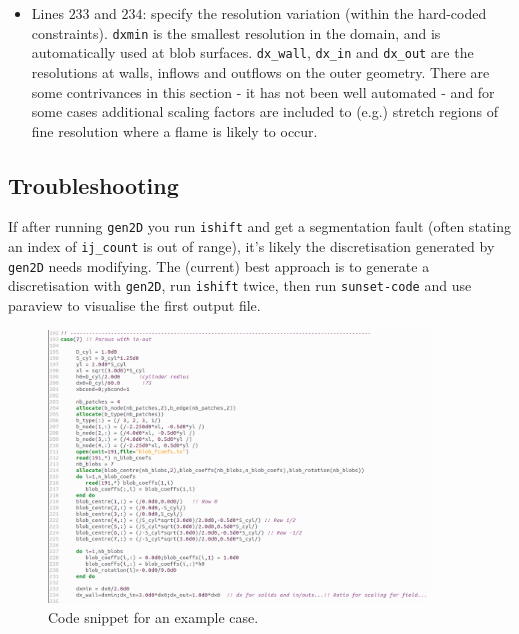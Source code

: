 \documentclass[notitlepage]{revtex4-1}
\begin{document}
\begin{itemize}
\item Lines $233$ and $234$: specify the resolution variation (within the hard-coded constraints). \verb|dxmin| is the smallest resolution in the domain, and is automatically used at blob surfaces. \verb|dx_wall|, \verb|dx_in| and \verb|dx_out| are the resolutions at walls, inflows and outflows on the outer geometry. There are some contrivances in this section - it has not been well automated - and for some cases additional scaling factors are included to (e.g.) stretch regions of fine resolution where a flame is likely to occur.
\end{itemize}

\subsection{Troubleshooting}

If after running \verb|gen2D| you run \verb|ishift| and get a segmentation fault (often stating an index of \verb|ij_count| is out of range), it's likely the discretisation generated by \verb|gen2D| needs modifying. The (current) best approach is to generate a discretisation with \verb|gen2D|, run \verb|ishift| twice, then run \verb|sunset-code| and use paraview to visualise the first output file.

\begin{figure}
\includegraphics[width=0.9\textwidth]{case7.png}
\caption{Code snippet for an example case.\label{fig:case7}}
\end{figure}




\end{document}
